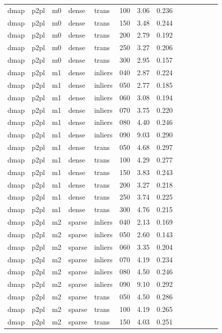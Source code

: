 \begin{table}[htbp]
\begin{tabular}{llllllrrrrrrrr}
  dmap & p2pl & m0 & dense & trans & 100 & 3.06 & 0.236 \\
  dmap & p2pl & m0 & dense & trans & 150 & 3.48 & 0.244 \\
  dmap & p2pl & m0 & dense & trans & 200 & 2.79 & 0.192 \\
  dmap & p2pl & m0 & dense & trans & 250 & 3.27 & 0.206 \\
  dmap & p2pl & m0 & dense & trans & 300 & 2.95 & 0.157 \\
  dmap & p2pl & m1 & dense & inliers & 040 & 2.87 & 0.224 \\
  dmap & p2pl & m1 & dense & inliers & 050 & 2.77 & 0.185 \\
  dmap & p2pl & m1 & dense & inliers & 060 & 3.08 & 0.194 \\
  dmap & p2pl & m1 & dense & inliers & 070 & 3.75 & 0.220 \\
  dmap & p2pl & m1 & dense & inliers & 080 & 4.40 & 0.246 \\
  dmap & p2pl & m1 & dense & inliers & 090 & 9.03 & 0.290 \\
  dmap & p2pl & m1 & dense & trans & 050 & 4.68 & 0.297 \\
  dmap & p2pl & m1 & dense & trans & 100 & 4.29 & 0.277 \\
  dmap & p2pl & m1 & dense & trans & 150 & 3.83 & 0.243 \\
  dmap & p2pl & m1 & dense & trans & 200 & 3.27 & 0.218 \\
  dmap & p2pl & m1 & dense & trans & 250 & 3.74 & 0.225 \\
  dmap & p2pl & m1 & dense & trans & 300 & 4.76 & 0.215 \\
  dmap & p2pl & m2 & sparse & inliers & 040 & 2.13 & 0.169 \\
  dmap & p2pl & m2 & sparse & inliers & 050 & 2.60 & 0.143 \\
  dmap & p2pl & m2 & sparse & inliers & 060 & 3.35 & 0.204 \\
  dmap & p2pl & m2 & sparse & inliers & 070 & 4.19 & 0.234 \\
  dmap & p2pl & m2 & sparse & inliers & 080 & 4.50 & 0.246 \\
  dmap & p2pl & m2 & sparse & inliers & 090 & 9.10 & 0.292 \\
  dmap & p2pl & m2 & sparse & trans & 050 & 4.50 & 0.286 \\
  dmap & p2pl & m2 & sparse & trans & 100 & 4.19 & 0.265 \\
  dmap & p2pl & m2 & sparse & trans & 150 & 4.03 & 0.251 \\

\end{tabular}
\end{table}
